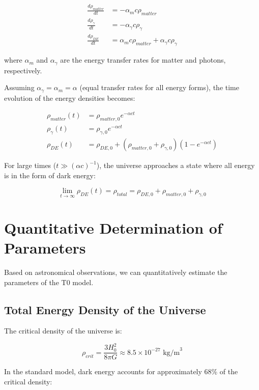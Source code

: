 \documentclass[a4paper,12pt]{article}
\begin{document}
\begin{align}
	\frac{d\rho_{matter}}{dt} &= -\alpha_{m} c \rho_{matter} \\
	\frac{d\rho_{\gamma}}{dt} &= -\alpha_{\gamma} c \rho_{\gamma} \\
	\frac{d\rho_{DE}}{dt} &= \alpha_{m} c \rho_{matter} + \alpha_{\gamma} c \rho_{\gamma}
\end{align}

where $\alpha_{m}$ and $\alpha_{\gamma}$ are the energy transfer rates for matter and photons, respectively.

Assuming $\alpha_{\gamma} = \alpha_{m} = \alpha$ (equal transfer rates for all energy forms), the time evolution of the energy densities becomes:

\begin{align}
	\rho_{matter}(t) &= \rho_{matter,0} e^{-\alpha c t} \\
	\rho_{\gamma}(t) &= \rho_{\gamma,0} e^{-\alpha c t} \\
	\rho_{DE}(t) &= \rho_{DE,0} + (\rho_{matter,0} + \rho_{\gamma,0})(1 - e^{-\alpha c t})
\end{align}

For large times ($t \gg (\alpha c)^{-1}$), the universe approaches a state where all energy is in the form of dark energy:

\begin{equation}
	\lim_{t \rightarrow \infty} \rho_{DE}(t) = \rho_{total} = \rho_{DE,0} + \rho_{matter,0} + \rho_{\gamma,0}
\end{equation}

\section{Quantitative Determination of Parameters}

Based on astronomical observations, we can quantitatively estimate the parameters of the T0 model.

\subsection{Total Energy Density of the Universe}

The critical density of the universe is:

\begin{equation}
	\rho_{crit} = \frac{3H_0^2}{8\pi G} \approx 8.5 \times 10^{-27} \text{ kg/m}^3
\end{equation}

In the standard model, dark energy accounts for approximately 68\% of the critical density:
\end{document}
